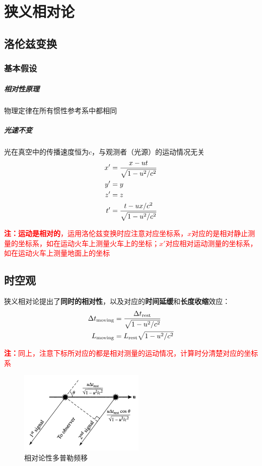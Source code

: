 \chapter{狭义相对论}
\section{洛伦兹变换}
\subsection{基本假设}
\paragraph{相对性原理}
物理定律在所有惯性参考系中都相同
\paragraph{光速不变}
光在真空中的传播速度恒为$c$，与观测者（光源）的运动情况无关
\begin{align}
  x' &={x-ut \over \sqrt{1-u^2/c^2}}\\
  y' &=y\\
  z' &=z\\
  t' &={t-ux/c^2 \over \sqrt{1-u^2/c^2}}
\end{align}

\textcolor{red}{{\bf 注：运动是相对的}，运用洛伦兹变换时应注意对应坐标系，$x$对应的是相对静止测量的坐标系，如在运动火车上测量火车上的坐标；$x'$对应相对运动测量的坐标系，如在运动火车上测量地面上的坐标}

\section{时空观}
狭义相对论提出了{\bf 同时的相对性}，以及对应的\textbf{时间延缓}和\textbf{长度收缩}效应：
\begin{align}
  \Delta t_\mathrm{moving}&={\Delta t_\mathrm{rest} \over \sqrt{1-u^2/c^2}}\\
  L_\mathrm{moving}&=L_\mathrm{rest}\sqrt{1-u^2/c^2}
\end{align}

\textcolor{red}{{\bf 注：}同上，注意下标所对应的都是相对测量的运动情况，计算时分清楚对应的坐标系}

\begin{figure}[hbt]
  \centering
  \includegraphics[width=6cm]{chapters/04/dopper}
  \caption{相对论性多普勒频移}
  \label{fig:doppler}
\end{figure}

